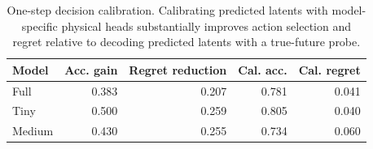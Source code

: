 \begin{table}[t]
\centering
\small
\begin{tabular}{lrrrr}
\toprule
Model & Acc. gain & Regret reduction & Cal. acc. & Cal. regret \\
\midrule
Full & 0.383 & 0.207 & 0.781 & 0.041 \\
Tiny & 0.500 & 0.259 & 0.805 & 0.040 \\
Medium & 0.430 & 0.255 & 0.734 & 0.060 \\
\bottomrule
\end{tabular}
\caption{One-step decision calibration. Calibrating predicted latents with model-specific physical heads substantially improves action selection and regret relative to decoding predicted latents with a true-future probe.}
\label{tab:decision_calibration_map}
\end{table}

